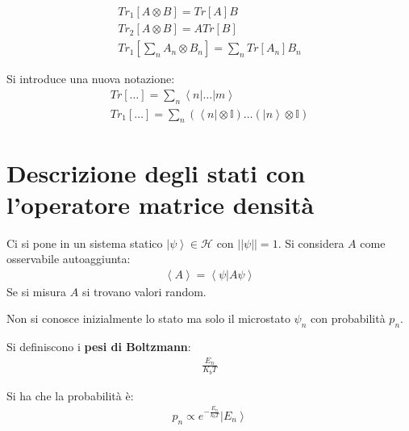 
\begin{equation}\begin{split}
Tr_1\left[A\otimes B\right]=Tr\left[A\right]B \\
Tr_2\left[A\otimes B\right]=ATr\left[B\right] \\
Tr_1\left[\sum_n{A_n\otimes B_n}\right]=\sum_n{Tr\left[A_n\right]B_n}
\end{split}\end{equation}

Si introduce una nuova notazione:
\begin{equation}\begin{split}
Tr\left[\dots\right]=\sum_n{\left\langle n|\dots |m \right\rangle} \\
Tr_1\left[\dots \right]=\sum_n{\left(\left\langle n\right |\otimes \mathbb{I}\right)\dots \left(\left |n \right\rangle\otimes \mathbb{I}\right)}
\end{split}\end{equation}


\chapter{Descrizione degli stati con l'operatore matrice densità} %
Ci si pone in un sistema statico $\left |\psi  \right\rangle\in \mathcal{H}$ con $||\psi ||=1$. Si considera $A$ come osservabile autoaggiunta:
\begin{equation}\begin{split}
\left\langle A \right\rangle=\left\langle \psi |A\psi  \right\rangle
\end{split}\end{equation}
Se si misura $A$ si trovano valori random.

Non si conosce inizialmente lo stato ma solo il microstato $\psi _n$ con probabilità $p_n$.

Si definiscono i \textbf{pesi di Boltzmann}:
\begin{equation}\begin{split}
\frac{E_n}{K_bT}
\end{split}\end{equation}

Si ha che la probabilità è:
\begin{equation}\begin{split}
p_n\propto e^{-\frac{E_n}{k_bT}}\left |E_n \right\rangle
\end{split}\end{equation}

